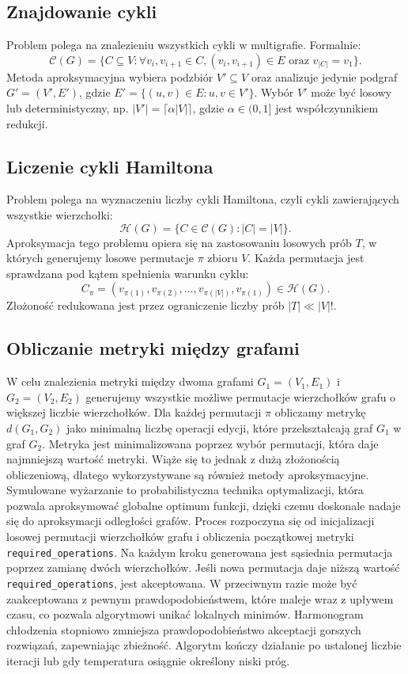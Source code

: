 \subsection{Znajdowanie cykli}

Problem polega na znalezieniu wszystkich cykli w multigrafie. Formalnie:
\[
\mathcal{C}(G) = \{ C \subseteq V : \forall v_i, v_{i+1} \in C, (v_i, v_{i+1}) \in E \text{ oraz } v_{|C|} = v_1 \}.
\]
Metoda aproksymacyjna wybiera podzbiór \( V' \subseteq V \) oraz analizuje jedynie podgraf \( G' = (V', E') \), gdzie \( E' = \{ (u, v) \in E : u, v \in V' \} \). Wybór \( V' \) może być losowy lub deterministyczny, np. \( |V'| = \lceil \alpha |V| \rceil \), gdzie \( \alpha \in (0, 1] \) jest współczynnikiem redukcji.

\subsection{Liczenie cykli Hamiltona}

Problem polega na wyznaczeniu liczby cykli Hamiltona, czyli cykli zawierających wszystkie wierzchołki:
\[
\mathcal{H}(G) = \{ C \in \mathcal{C}(G) : |C| = |V| \}.
\]
Aproksymacja tego problemu opiera się na zastosowaniu losowych prób \( T \), w których generujemy losowe permutacje \( \pi \) zbioru \( V \). Każda permutacja jest sprawdzana pod kątem spełnienia warunku cyklu:
\[
C_\pi = (v_{\pi(1)}, v_{\pi(2)}, \dots, v_{\pi(|V|)}, v_{\pi(1)}) \in \mathcal{H}(G).
\]
Złożoność redukowana jest przez ograniczenie liczby prób \( |T| \ll |V|! \).

\subsection{Obliczanie metryki między grafami}

W celu znalezienia metryki między dwoma grafami \( G_1 = (V_1, E_1) \) i \( G_2 = (V_2, E_2) \) generujemy wszystkie możliwe permutacje wierzchołków grafu o większej liczbie wierzchołków. Dla każdej permutacji \( \pi \) obliczamy metrykę \( d(G_1, G_2) \) jako minimalną liczbę operacji edycji, które przekształcają graf \( G_1 \) w graf \( G_2 \). Metryka jest minimalizowana poprzez wybór permutacji, która daje najmniejszą wartość metryki. Wiąże się to jednak z dużą złożonością obliczeniową, dlatego wykorzystywane są również metody aproksymacyjne. \\
Symulowane wyżarzanie to probabilistyczna technika optymalizacji, która pozwala aproksymować globalne optimum funkcji, dzięki czemu doskonale nadaje się do aproksymacji odległości grafów. Proces rozpoczyna się od inicjalizacji losowej permutacji wierzchołków grafu i obliczenia początkowej metryki \texttt{required\_operations}. Na każdym kroku generowana jest sąsiednia permutacja poprzez zamianę dwóch wierzchołków. Jeśli nowa permutacja daje niższą wartość \texttt{required\_operations}, jest akceptowana. W przeciwnym razie może być zaakceptowana z pewnym prawdopodobieństwem, które maleje wraz z upływem czasu, co pozwala algorytmowi unikać lokalnych minimów. Harmonogram chłodzenia stopniowo zmniejsza prawdopodobieństwo akceptacji gorszych rozwiązań, zapewniając zbieżność. Algorytm kończy działanie po ustalonej liczbie iteracji lub gdy temperatura osiągnie określony niski próg.

